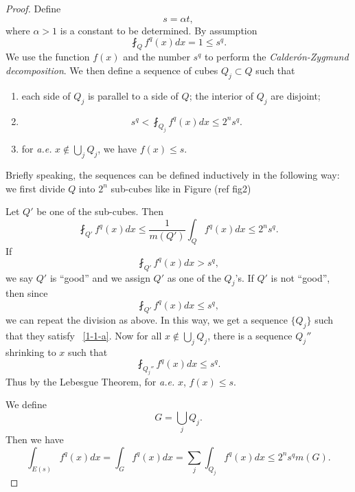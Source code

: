\begin{proof}
Define
\[
s=\alpha t,
\]
where $\alpha>1$ is a constant to be determined. By assumption
\[
\fint_Q f^q(x) dx=1\leq s^q.
\]
We use the function $f(x)$ and the number $s^q$ to perform the \emph{Calder\'on-Zygmund
decomposition}. We then  define  a sequence of cubes $Q_j\subset Q$ such that
\begin{enumerate}
\item each side of $Q_j$ is parallel to a side of $Q$; the interior of $Q_j$ are disjoint;
\item
\begin{equation}\label{1-1-a}
s^q<\fint_{Q_j} f^q(x) dx\leq 2^n s^q.
\end{equation}
\item for \emph{a.e.} $x\not\in \bigcup_j Q_j$, we have $f(x)\leq s$.
\end{enumerate}
 Briefly speaking, the sequences can be defined inductively in the following way: we first divide $Q$ into $2^n$ sub-cubes like in Figure (ref fig2)
 
\begin{center}
  \end{center}

 
 Let $Q'$ be one of the sub-cubes. Then
 \[
 \fint_{Q'} f^q(x) dx\leq \frac{1}{m(Q')}\int_Q f^q(x)dx\leq 2^n s^q.
 \]
 If \[
 \fint_{Q'} f^q(x) dx>s^q,
 \]
 we say $Q'$ is ``good'' and we assign $Q'$ as one of the $Q_j$'s. If $Q'$ is not ``good'', then since 
 \[
 \fint_{Q'} f^q(x) dx\leq s^q,
 \]
 we can repeat the division as above. In this way, we get a sequence $\{Q_j\}$ such that they satisfy ~\eqref{1-1-a}. Now for all $x\not\in \bigcup_j Q_j$, there is a sequence $Q_j''$ shrinking to $x$ such that
 \[
 \fint_{Q_j''} f^q(x)dx\leq s^q.
 \]
 Thus by the Lebesgue Theorem, for \emph{a.e.} $x$, $f(x)\leq s$.
 
 We define 
 \[
 G=\bigcup_jQ_j.
 \]
 Then we have
 \[
 \int_{E(s)} f^q(x) dx=\int_G f^q(x)dx=\sum_j\int_{Q_j} f^q(x) dx\leq 2^n s^q m(G).
 \]
 

\end{proof}
